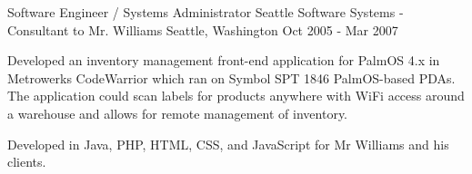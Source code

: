 \begin{cventries}
    \cventry
    {Software Engineer / Systems Administrator}
    {Seattle Software Systems - Consultant to Mr. Williams} 
    {Seattle, Washington} 
    {Oct 2005 - Mar 2007} 
    { 
        \begin{cvitems}
        \item {Developed an inventory management front-end application for PalmOS 4.x in Metrowerks CodeWarrior which ran on Symbol SPT 1846 PalmOS-based PDAs. The application could scan labels for products anywhere with WiFi access around a warehouse and allows for remote management of inventory.}
        \item {Developed in Java, PHP, HTML, CSS, and JavaScript for Mr Williams and his clients.}
        \end{cvitems}
    }

\end{cventries}
